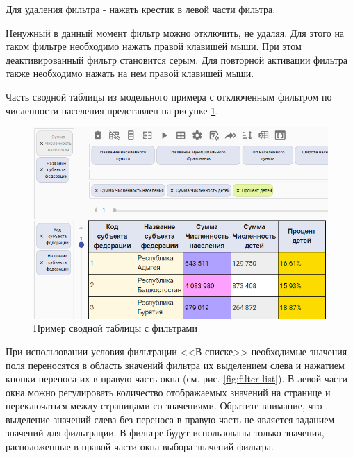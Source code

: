 \documentclass[../user-manual.tex]{subfiles}
\begin{document}
	Для удаления фильтра - нажать крестик в левой части фильтра.
	
	Ненужный в данный момент фильтр можно отключить, не удаляя. Для этого на таком фильтре необходимо нажать правой клавишей мыши. При этом деактивированный фильтр становится серым. Для повторной активации фильтра также необходимо нажать на нем правой клавишей мыши.
	
	Часть сводной таблицы из модельного примера с отключенным фильтром по численности населения представлен на рисунке \ref{fig:filter-example}.
	
	\begin{figure}[h]
		\centering
		\includegraphics[width=\graphicswidth]{img/22-filter-exam.png}
		\caption{Пример сводной таблицы с фильтрами}
		\label{fig:filter-example}
	\end{figure}
	
	При использовании условия фильтрации <<В списке>> необходимые значения поля переносятся в область значений фильтра их выделением слева и нажатием кнопки переноса их в правую часть окна (см. рис. \ref{fig:filter-list}). В левой части окна можно регулировать количество отображаемых значений на странице и переключаться между страницами со значениями. Обратите внимание, что выделение значений слева без переноса в правую часть не является заданием значений для фильтрации. В фильтре будут использованы только значения, расположенные в правой части окна выбора значений фильтра.
		
\end{document}
